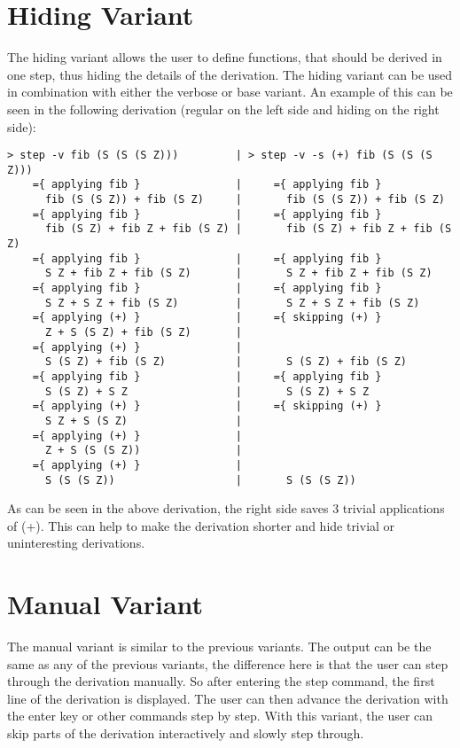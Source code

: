 \section{Hiding Variant}

The hiding variant allows the user to define functions, that should be derived in one step, thus hiding the details of the derivation.
The hiding variant can be used in combination with either the verbose or base variant.
An example of this can be seen in the following derivation (regular on the left side and hiding on the right side):

\begin{verbatim}
> step -v fib (S (S (S Z)))         | > step -v -s (+) fib (S (S (S Z)))
    ={ applying fib }               |     ={ applying fib }
      fib (S (S Z)) + fib (S Z)     |       fib (S (S Z)) + fib (S Z)
    ={ applying fib }               |     ={ applying fib }
      fib (S Z) + fib Z + fib (S Z) |       fib (S Z) + fib Z + fib (S Z)
    ={ applying fib }               |     ={ applying fib } 
      S Z + fib Z + fib (S Z)       |       S Z + fib Z + fib (S Z)
    ={ applying fib }               |     ={ applying fib }
      S Z + S Z + fib (S Z)         |       S Z + S Z + fib (S Z)
    ={ applying (+) }               |     ={ skipping (+) }
      Z + S (S Z) + fib (S Z)       |       
    ={ applying (+) }               |
      S (S Z) + fib (S Z)           |       S (S Z) + fib (S Z)
    ={ applying fib }               |     ={ applying fib }
      S (S Z) + S Z                 |       S (S Z) + S Z
    ={ applying (+) }               |     ={ skipping (+) }
      S Z + S (S Z)                 |
    ={ applying (+) }               |
      Z + S (S (S Z))               |
    ={ applying (+) }               |
      S (S (S Z))                   |       S (S (S Z))
\end{verbatim}

As can be seen in the above derivation, the right side saves 3 trivial applications of (+).
This can help to make the derivation shorter and hide trivial or uninteresting derivations.

\section{Manual Variant}

The manual variant is similar to the previous variants.
The output can be the same as any of the previous variants, the difference here is that the user can step through the derivation manually.
So after entering the step command, the first line of the derivation is displayed.
The user can then advance the derivation with the enter key or other commands step by step.
With this variant, the user can skip parts of the derivation interactively and slowly step through.


